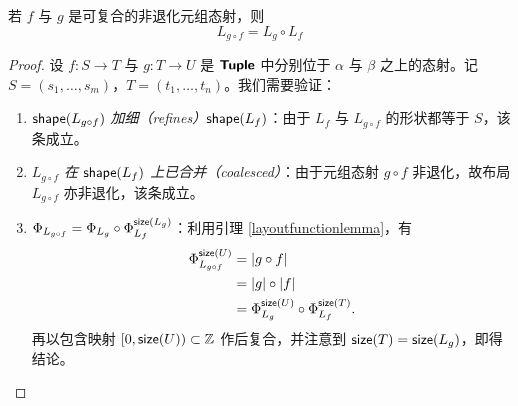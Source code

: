 \begin{corollary}\label{compatibilityofcompositioninC}
    若 $f$ 与 $g$ 是可复合的非退化元组态射，则
    \[
    L_{g \circ f} = L_g \circ L_f
    \]
\end{corollary}

\begin{proof}
    设 $f:S \to T$ 与 $g:T \to U$ 是 ${\boldsymbol{\mathsf{Tuple}}}$ 中分别位于 $\alpha$ 与 $\beta$ 之上的态射。记 $S = (s_1,\dots,s_m)$，$T = (t_1,\dots,t_n)$。我们需要验证：
    \begin{enumerate}
        \item {\it  $\mathsf{shape}(L_{g \circ f})$ 加细（refines）$\mathsf{shape}(L_f)$}：由于 $L_f$ 与 $L_{g \circ f}$ 的形状都等于 $S$，该条成立。
        \item {\it $L_{g \circ f}$ 在 $\mathsf{shape}(L_f)$ 上已合并（coalesced）}：由于元组态射 $g \circ f$ 非退化，故布局 $L_{g \circ f}$ 亦非退化，该条成立。
        \item {\it $\Phi_{L_{g\circ f}} = \Phi_{L_g} \circ \Phi_{L_f}^{\mathsf{size}(L_g)}$}：利用引理 \ref{layoutfunctionlemma}，有
        \begin{align*}
        \Phi_{L_{g \circ f}}^{\mathsf{size}(U)} &  = |g \circ f|\\
        & = |g| \circ |f|\\
        & = \Phi_{L_g}^{\mathsf{size}(U)} \circ \Phi_{L_f}^{\mathsf{size}(T)}.
        \end{align*}
        再以包含映射 $[0,\mathsf{size}(U)) \subset \mathbb{Z}$ 作后复合，并注意到 $\mathsf{size}(T) = \mathsf{size}(L_{g})$，即得结论。
    \end{enumerate}
\end{proof}
